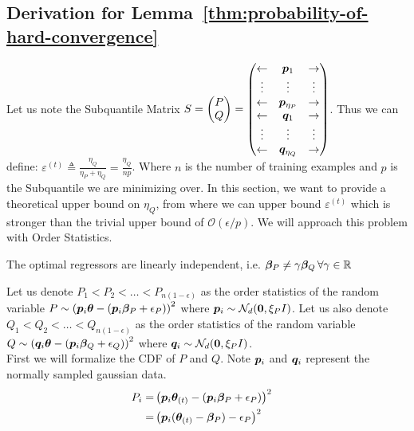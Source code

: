 \documentclass{article} %
\begin{document}
\begin{appendices}
	\subsection{Derivation for Lemma~\ref{thm:probability-of-hard-convergence}}
	Let us note the Subquantile Matrix $\displaystyle S = \begin{pmatrix} P \\ Q \end{pmatrix} = \begin{pmatrix} \leftarrow & {\bm{p}}_1 & \rightarrow \\ \vdots & \vdots & \vdots \\ \leftarrow & {\bm{p}}_{\eta_P} & \rightarrow \\ \leftarrow & {\bm{q}}_1 & \rightarrow \\ \vdots & \vdots & \vdots \\ \leftarrow & {\bm{q}}_{\eta_Q} & \rightarrow\end{pmatrix}$. Thus we can define: $\displaystyle \varepsilon^{(t)} \triangleq \frac{\eta_Q}{\eta_P + \eta_Q} = \frac{\eta_Q}{np}$. Where $n$ is the number of training examples and $p$ is the Subquantile we are minimizing over. In this section, we want to provide a theoretical upper bound on $\eta_Q$, from where we can upper bound $\varepsilon^{(t)}$ which is stronger than the trivial upper bound of $\displaystyle \mathcal{O}\left(\epsilon/p\right)$. We will approach this problem with Order Statistics.
	\begin{assumption}
		The optimal regressors are linearly independent, i.e. ${\bm{\beta}}_P \neq \gamma {\bm{\beta}}_Q\, \forall \gamma \in \mathbb{R}$
	\end{assumption}
	Let us denote $P_1 < P_2 < \dots < P_{n(1 - \epsilon)}$ as the order statistics of the random variable $P \sim \left({\bm{p}}_i {\bm{\theta}} - ({\bm{p}}_i {\bm{\beta}}_P + \epsilon_P)\right)^2$ where $ {\bm{p}}_i \sim \mathcal{N}_d({\bm{0}}, \xi_P I)$. Let us also denote $Q_1 < Q_2 < \dots < Q_{n(1 - \epsilon)}$ as the order statistics of the random variable $Q \sim \left({\bm{q}}_i {\bm{\theta}} - ({\bm{p}}_i {\bm{\beta}}_Q + \epsilon_Q)\right)^2$ where $ {\bm{q}}_i \sim \mathcal{N}_d({\bm{0}}, \xi_P I)$.\\
	First we will formalize the CDF of $P$ and $Q$. Note ${\bm{p}}_i$ and ${\bm{q}}_i$ represent the normally sampled gaussian data. 
	\begin{align}
		P_i = &\left(\vp_i\vtheta_{(t)} - (\vp_i \vbeta_P + \eps_P)\right)^2 &&\\
		= &\left(\vp_i(\vtheta_{(t)} - \vbeta_P) - \eps_P\right)^2 &&\\

\end{align}
\end{appendices}
\end{document}
